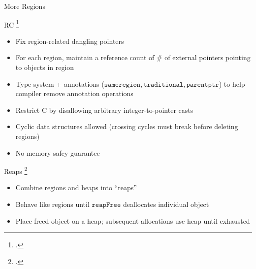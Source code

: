 \documentclass[aspectratio=169]{beamer}
\begin{document}
\begin{frame}{More Regions}
    \footnotesize{
RC \footcite{gay_language_2001}
    \vspace{-0.1in}
   \begin{itemize}
     \item Fix region-related dangling pointers %
     \item For each region, maintain a reference count of \# of external pointers pointing to objects in region %
     \item Type system + annotations ($\texttt{sameregion}, \texttt{traditional}, \texttt{parentptr}$) to help compiler remove annotation operations %
     \item Restrict C by disallowing arbitrary integer-to-pointer casts
     \item Cyclic data structures allowed (crossing cycles must break before deleting regions)
     \item No memory safey guarantee
   \end{itemize}
Reaps \footcite{berger_reconsidering_2002}
    \vspace{-0.1in}
   \begin{itemize}
     \item Combine regions and heaps into ``reaps''
     \item Behave like regions until $\texttt{reapFree}$ deallocates individual object
     \item Place freed object on a heap; subsequent allocations use heap until exhausted
   \end{itemize}
}
    \vspace{0.2in}
\end{frame}
\end{document}
